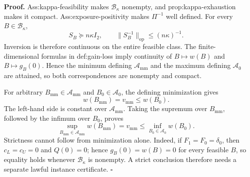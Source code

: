 \textbf{Proof.}
Ass:kappa-feasibility makes \(\mathcal B_\kappa\) nonempty, and prop:kappa-exhaustion makes it compact.  Ass:exposure-positivity makes \(\Pi^{-1}\) well defined.  For every \(B\in\mathcal B_\kappa\),
\[
S_B\succeq n\kappa I_2,
\qquad
\lVert S_B^{-1}\rVert_{\mathrm{op}}\le(n\kappa)^{-1}.
\]
Inversion is therefore continuous on the entire feasible class.  The finite-dimensional formulas in def:gain-loss imply continuity of \(B\mapsto w(B)\) and \(B\mapsto g_B(0)\).  Hence the minimum defining \(\mathcal A_{\mathrm{mm}}\) and the maximum defining \(\mathcal A_0\) are attained, so both correspondences are nonempty and compact.

For arbitrary \(B_{\mathrm{mm}}\in\mathcal A_{\mathrm{mm}}\) and \(B_0\in\mathcal A_0\), the defining minimization gives
\[
w(B_{\mathrm{mm}})=v_{\mathrm{mm}}\le w(B_0).
\]
The left-hand side is constant over \(\mathcal A_{\mathrm{mm}}\).  Taking the supremum over \(B_{\mathrm{mm}}\), followed by the infimum over \(B_0\), proves
\[
\sup_{B_{\mathrm{mm}}\in\mathcal A_{\mathrm{mm}}}w(B_{\mathrm{mm}})
=v_{\mathrm{mm}}
\le
\inf_{B_0\in\mathcal A_0}w(B_0).
\]
Strictness cannot follow from minimization alone.  Indeed, if \(F_1=F_0=\delta_0\), then \(c_L=c_U=0\) and \(Q(0)=0\); hence \(g_B(0)=w(B)=0\) for every feasible \(B\), so equality holds whenever \(\mathcal B_\kappa\) is nonempty.  A strict conclusion therefore needs a separate lawful instance certificate. \(\square\)